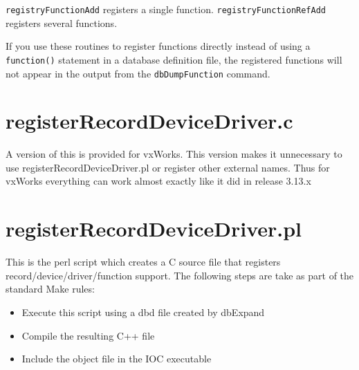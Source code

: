 \verb|registryFunctionAdd| registers a single function. \verb|registryFunctionRefAdd| registers several functions.

If you use these routines to register functions directly instead of using a \verb|function()| statement in a database definition 
file, the registered functions will not appear in the output from the \verb|dbDumpFunction| command.

\section{registerRecordDeviceDriver.c}

A version of this is provided for vxWorks. This version makes it unnecessary to use registerRecordDeviceDriver.pl or 
register other external names. Thus for vxWorks everything can work almost exactly like it did in release 3.13.x

\section{registerRecordDeviceDriver.pl}

This is the perl script which creates a C source file that registers record/device/driver/function support. The following 
steps are take as part of the standard Make rules:

\begin{itemize}
\item Execute this script using a dbd file created by dbExpand

\item Compile the resulting C++ file

\item Include the object file in the IOC executable

\end{itemize}
